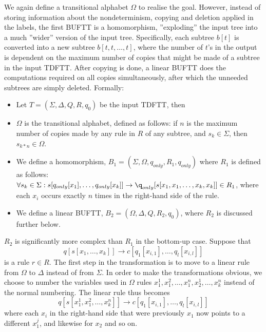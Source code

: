 We again define a transitional alphabet $\Omega$ to realise the goal.
However, instead of storing information about the nondeterminism, copying
and deletion applied in the labels, the first BUFTT is a homomorphism,
''exploding'' the input tree into a much ''wider'' version of the input
tree. Specifically, each subtree $b[t]$ is converted into a new subtree
$b[t,t,\ldots,t]$, where the number of $t$'s in the output is dependent on
the maximum number of copies that might be made of a subtree in the input
TDFTT. After copying is done, a linear BUFTT does the computations required
on all copies simultaneously, after which the unneeded subtrees are simply
deleted. Formally:

\begin{itemize}
\item Let $T = (\Sigma, \Delta, Q, R, q_0)$ be the input TDFTT, then

\item $\Omega$ is the transitional alphabet, defined as follows: if $n$ is
the maximum number of copies made by any rule in $R$ of any subtree, and 
$s_k \in \Sigma$, then $s_{k*n} \in \Omega$.

\item We define a homomorphism, $B_1 = (\Sigma, \Omega, q_{only}, R_1, q_{only})$
where $R_1$ is defined as follows: $\forall s_k \in \Sigma:
s[q_{only}[x_1],\ldots,q_{only}[x_k]] \rightarrow
\q_{only}[s[x_1,x_1,\ldots,x_k,x_k]] \in R_1$, where each $x_i$ occurs
exactly $n$ times in the right-hand side of the rule.

\item We define a linear BUFTT, $B_2 = (\Omega, \Delta, Q, R_2, q_0)$,
	where $R_2$ is discussed further below.
\end{itemize}

$R_2$ is significantly more complex than $R_1$ in the bottom-up case. Suppose
that $$q[s[x_1,\ldots,x_k]] \rightarrow c[q_1[x_{i,1}],\ldots,q_l[x_{i,l}]]$$
is a rule $r \in R$. The first step in the transformation is to move to a
linear rule from $\Omega$ to $\Delta$ instead of from $\Sigma$.  In order
to make the transformations obvious, we choose to number the variables used
in $\Omega$ rules $x_1^1,x_1^2,\ldots,x_1^n,x_2^1,\ldots,x_k^n$ instead of
the normal numbering. The linear rule thus becomes
$$q[s[x_1^1,x_1^2,\ldots,x_k^n]] \rightarrow c[q_1[x_{i,1}],\ldots,q_l[x_{i,l}]]$$
where each $x_i$ in the right-hand side that were previously $x_1$ now
points to a different $x_1^j$, and likewise for $x_2$ and so on.

